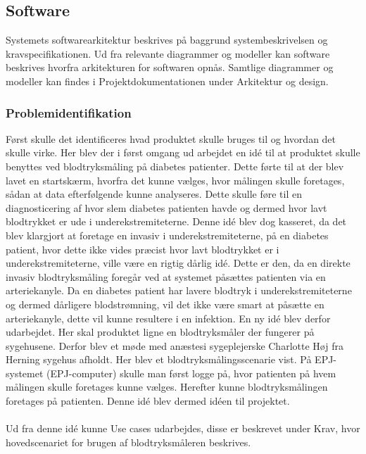 	\subsection{Software}
Systemets softwarearkitektur beskrives på baggrund systembeskrivelsen og kravspecifikationen. Ud fra relevante diagrammer og modeller kan software beskrives hvorfra arkitekturen for softwaren opnås. Samtlige diagrammer og modeller kan findes i Projektdokumentationen under Arkitektur og design.
\subsubsection{Problemidentifikation}
Først skulle det identificeres hvad produktet skulle bruges til og hvordan det skulle virke. Her blev der i først omgang ud arbejdet en idé til at produktet skulle benyttes ved blodtryksmåling på diabetes patienter. Dette førte til at der blev lavet en startskærm, hvorfra det kunne vælges, hvor målingen skulle foretages, sådan at data efterfølgende kunne analyseres. Dette skulle føre til en diagnosticering af hvor slem diabetes patienten havde og dermed hvor lavt blodtrykket er ude i underekstremiteterne. Denne idé blev dog kasseret, da det blev klargjort at foretage en invasiv i underekstremiteterne, på en diabetes patient, hvor dette ikke vides præcist hvor lavt blodtrykket er i underekstremiteterne, ville være en rigtig dårlig idé. Dette er den, da en direkte invasiv blodtryksmåling foregår ved at systemet påsættes patienten via en arteriekanyle. Da en diabetes patient har lavere blodtryk i underekstremiteterne og dermed dårligere blodstrømning, vil det ikke være smart at påsætte en arteriekanyle, dette vil kunne resultere i en infektion. En ny idé blev derfor udarbejdet. Her skal produktet ligne en blodtryksmåler der fungerer på sygehusene. Derfor blev et møde med anæstesi sygeplejerske Charlotte Høj fra Herning sygehus afholdt. Her blev et blodtryksmålingsscenarie vist. På EPJ-systemet (EPJ-computer) skulle man først logge på, hvor patienten på hvem målingen skulle foretages kunne vælges. Herefter kunne blodtryksmålingen foretages på patienten. Denne idé blev dermed idéen til projektet.\\\\
Ud fra denne idé kunne Use cases udarbejdes, disse er beskrevet under Krav, hvor hovedscenariet for brugen af blodtryksmåleren beskrives.

